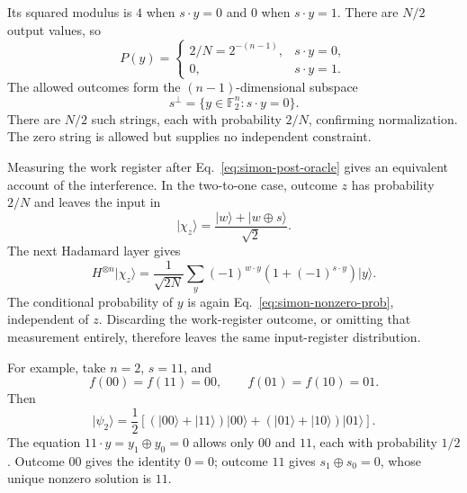 \documentclass[11pt,oneside,openany]{book}
\providecommand{\ket}{}
\renewcommand{\ket}[1]{\lvert #1\rangle}
\newcommand{\Ftwo}{\mathbb F_2}
\theoremstyle{definition}
\begin{document}
Its squared modulus is $4$ when $s\cdot y=0$ and $0$ when $s\cdot y=1$. There are $N/2$ output values, so
\begin{equation}
 \boxed{P(y)=\begin{cases}2/N=2^{-(n-1)},&s\cdot y=0,\\0,&s\cdot y=1.
 \end{cases}}
 \label{eq:simon-nonzero-prob}
\end{equation}
The allowed outcomes form the $(n-1)$-dimensional subspace
\begin{equation}
 s^\perp=\{y\in\Ftwo^n:s\cdot y=0\}.
\end{equation}
There are $N/2$ such strings, each with probability $2/N$, confirming normalization. The zero string is allowed but supplies no independent constraint.

Measuring the work register after Eq.~\eqref{eq:simon-post-oracle} gives an equivalent account of the interference. In the two-to-one case, outcome $z$ has probability $2/N$ and leaves the input in
\begin{equation}
 \ket{\chi_z}=\frac{\ket w+\ket{w\oplus s}}{\sqrt2}.
\end{equation}
The next Hadamard layer gives
\begin{equation}
 H^{\otimes n}\ket{\chi_z}
 =\frac1{\sqrt{2N}}\sum_y(-1)^{w\cdot y}\left(1+(-1)^{s\cdot y}\right)\ket y.
\end{equation}
The conditional probability of $y$ is again Eq.~\eqref{eq:simon-nonzero-prob}, independent of $z$. Discarding the work-register outcome, or omitting that measurement entirely, therefore leaves the same input-register distribution.

For example, take $n=2$, $s=11$, and
\begin{equation}
 f(00)=f(11)=00,\qquad f(01)=f(10)=01.
\end{equation}
Then
\begin{equation}
 \ket{\psi_2}=\frac12\left[(\ket{00}+\ket{11})\ket{00}
 +(\ket{01}+\ket{10})\ket{01}\right].
\end{equation}
The equation $11\cdot y=y_1\oplus y_0=0$ allows only $00$ and $11$, each with probability $1/2$. Outcome $00$ gives the identity $0=0$; outcome $11$ gives $s_1\oplus s_0=0$, whose unique nonzero solution is $11$.
\end{document}

